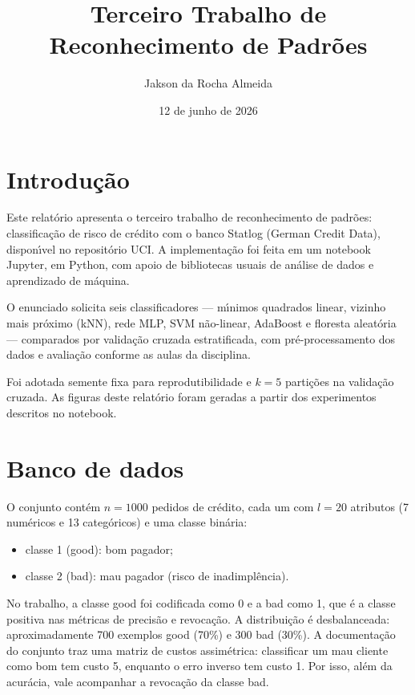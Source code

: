 \documentclass[12pt,a4paper]{article}
\title{Terceiro Trabalho de Reconhecimento de Padr\~oes}
\author{Jakson da Rocha Almeida}
\date{12 de junho de 2026}
\begin{document}
\maketitle

\section*{Introdu\c{c}\~ao}

Este relat\'orio apresenta o terceiro trabalho de reconhecimento de padr\~oes: classifica\c{c}\~ao de risco de cr\'edito com o banco Statlog (German Credit Data), dispon\'{\i}vel no reposit\'orio UCI.
A implementa\c{c}\~ao foi feita em um notebook Jupyter, em Python, com apoio de bibliotecas usuais de an\'alise de dados e aprendizado de m\'aquina.

O enunciado solicita seis classificadores --- m\'{\i}nimos quadrados linear, vizinho mais pr\'oximo (kNN), rede MLP, SVM n\~ao-linear, AdaBoost e floresta aleat\'oria --- comparados por valida\c{c}\~ao cruzada estratificada, com pr\'e-processamento dos dados e avalia\c{c}\~ao conforme as aulas da disciplina.

Foi adotada semente fixa para reprodutibilidade e $k=5$ parti\c{c}\~oes na valida\c{c}\~ao cruzada. As figuras deste relat\'orio foram geradas a partir dos experimentos descritos no notebook.

\section*{Banco de dados}

O conjunto cont\'em $n=1000$ pedidos de cr\'edito, cada um com $l=20$ atributos (7 num\'ericos e 13 categ\'oricos) e uma classe bin\'aria:

\begin{itemize}
  \item classe 1 (good): bom pagador;
  \item classe 2 (bad): mau pagador (risco de inadimpl\^encia).
\end{itemize}

No trabalho, a classe good foi codificada como 0 e a bad como 1, que \'e a classe positiva nas m\'etricas de precis\~ao e revoca\c{c}\~ao.
A distribui\c{c}\~ao \'e desbalanceada: aproximadamente 700 exemplos good (70\%) e 300 bad (30\%).
A documenta\c{c}\~ao do conjunto traz uma matriz de custos assim\'etrica: classificar um mau cliente como bom tem custo 5, enquanto o erro inverso tem custo 1. Por isso, al\'em da acur\'acia, vale acompanhar a revoca\c{c}\~ao da classe bad.
\end{document}
